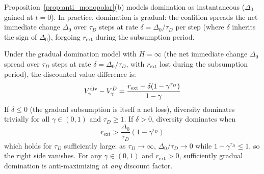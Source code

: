 Proposition~\ref{prop:anti_monopolar}(b) models domination as
instantaneous ($\Delta_0$ gained at $t = 0$). In practice, domination is
gradual: the coalition spreads the net immediate change $\Delta_0$ over
$\tau_D$ steps at rate $\delta = \Delta_0 / \tau_D$ per step (where
$\delta$ inherits the sign of $\Delta_0$), forgoing $r_{\mathrm{ext}}$
during the subsumption period.

\begin{corollary}
\label{cor:gradual}
Under the gradual domination model with $H = \infty$ (the net immediate
    change $\Delta_0$ spread over $\tau_D$ steps at rate $\delta =
    \Delta_0 / \tau_D$, with $r_{\mathrm{ext}}$ lost during the
    subsumption period), the discounted value difference is:
\begin{equation}
\label{eq:gradual}
V_\gamma^{\mathrm{div}} - V_\gamma^{D}
  = \frac{r_{\mathrm{ext}} - \delta(1 - \gamma^{\tau_D})}{1 - \gamma}
\end{equation}
If $\delta \leq 0$ (the gradual subsumption is itself a net loss),
    diversity dominates trivially for all $\gamma \in (0, 1)$ and
    $\tau_D \geq 1$. If $\delta > 0$, diversity dominates when
\begin{equation}
\label{eq:tau_threshold}
r_{\mathrm{ext}} > \frac{\Delta_0}{\tau_D}(1 - \gamma^{\tau_D})
\end{equation}
which holds for $\tau_D$ sufficiently large: as $\tau_D \to \infty$,
    $\Delta_0 / \tau_D \to 0$ while $1 - \gamma^{\tau_D} \leq 1$, so the
    right side vanishes. For any $\gamma \in (0, 1)$ and $r_{\mathrm{ext}}
    > 0$, sufficiently gradual domination is anti-maximizing at \emph{any}
    discount factor.
\end{corollary}

